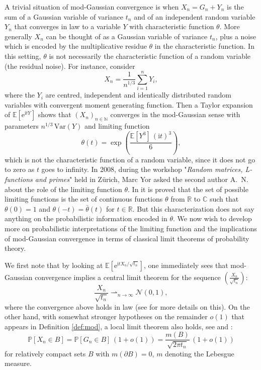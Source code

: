 \documentclass[12pt,a4paper,reqno]{amsart}
\newcommand{\N}{\mathbb{N}}
\newcommand{\R}{\mathbb{R}}
\newcommand{\CC}{\mathbb{C}}
\newcommand{\E}{\mathrm{e}}
\newcommand{\I}{\mathrm{i}}
\newcommand{\esper}{\mathbb{E}}
\newcommand{\proba}{\mathbb{P}}
\theoremstyle{remark}
\begin{document}
\noindent A trivial situation of mod-Gaussian convergence is when $X_n=G_n+Y_n$ is the sum of a Gaussian variable of variance $t_n$ and of an independent random variable $Y_n$ that converges in law to a variable $Y$ with characteristic function $\theta$. More generally $X_n$ can be thought of as a Gaussian variable of variance $t_n$, plus a noise which is encoded by the multiplicative residue $\theta$ in the characteristic function. In this setting, $\theta$ is not necessarily the characteristic function of a random variable (the residual noise). For instance, consider $$X_n=\frac{1}{n^{1/3}}\sum_{i=1}^n Y_i,$$ where the $Y_i$ are centred, independent and identically distributed random variables with convergent moment generating function. Then a Taylor expansion of $\esper[\E^{\I t Y}]$ shows that $(X_n)_{n \in \N}$ converges in the mod-Gaussian sense with parameters $n^{1/3}\,\mathrm{Var}(Y)$ and limiting function $$\theta(t)=\exp\left(\frac{\esper[Y^3]\,(\I t)^3}{6}\right),$$
which is not the characteristic function of a random variable, since it does not go to zero as $t$ goes to infinity. In 2008, during the workshop "\textit{Random matrices, L-functions and primes}" held in Z\"urich, Marc Yor asked the second author A.~N. about the role of the limiting function $\theta$. In \cite{KNN13} it is proved that the set of possible limiting functions is the set of continuous functions $\theta$ from $\R$ to $\CC$ such that $\theta(0)=1$ and $\theta(-t)=\bar\theta(t)$ for $t\in\R$. But this characterization does not say anything on the probabilistic information encoded in $\theta$.  We now wish to develop more on  probabilistic interpretations of the limiting function and the implications of mod-Gaussian convergence in terms of classical limit theorems of probability theory.
\bigskip

We first note that  by looking at $\esper[\E^{\I t X_n/\sqrt{t_n}}]$, one immediately sees that mod-Gaussian convergence implies a central limit theorem for the sequence $(\frac{X_n}{\sqrt{t_n}})$:
\begin{equation}
\frac{X_n}{\sqrt{t_n}} \rightharpoonup_{n \to \infty} \mathcal{N}(0,1),\label{eq:clt}
\end{equation}
where the convergence above holds in law (see \cite[\S 2-3]{JKN11} for more details on this). On the other hand, with somewhat stronger hypotheses on the remainder $o(1)$ that appears in Definition \ref{def:mod}, a local limit theorem also holds, see \cite[Theorem 4]{KN12} and \cite[Theorem 5]{DKN11}:
$$\proba[X_n \in B] = \proba[G_n \in B]\, (1+o(1)) = \frac{m(B)}{\sqrt{2\pi t_n}}\,(1+o(1))$$
for relatively compact sets $B$ with $m(\partial B)=0$, $m$ denoting the Lebesgue measure. \bigskip
\end{document}
